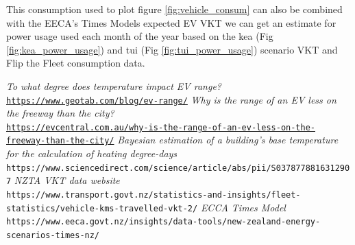\documentclass[
]{article}
\begin{document}
This consumption used to plot figure \ref{fig:vehicle_consum} can also
be combined with the EECA's Times Models expected EV VKT we can get an
estimate for power usage used each month of the year based on the kea
(Fig \ref{fig:kea_power_usage}) and tui (Fig \ref{fig:tui_power_usage})
scenario VKT and Flip the Fleet consumption data.

\begin{thebibliography}{9}
\textit{To what degree does temperature impact EV range?}
\\\texttt{\url{https://www.geotab.com/blog/ev-range/}}
\textit{Why is the range of an EV less on the freeway than the city?}
\\\texttt{\url{https://evcentral.com.au/why-is-the-range-of-an-ev-less-on-the-freeway-than-the-city/}}
\textit{Bayesian estimation of a building's base temperature for the calculation of heating degree-days}
\\\texttt{https://www.sciencedirect.com/science/article/abs/pii/S0378778816312907}
\textit{NZTA VKT data website}
\\\texttt{https://www.transport.govt.nz/statistics-and-insights/fleet-statistics/vehicle-kms-travelled-vkt-2/}
\textit{ECCA Times Model}
\\\texttt{https://www.eeca.govt.nz/insights/data-tools/new-zealand-energy-scenarios-times-nz/}
\end{thebibliography}
\end{document}
